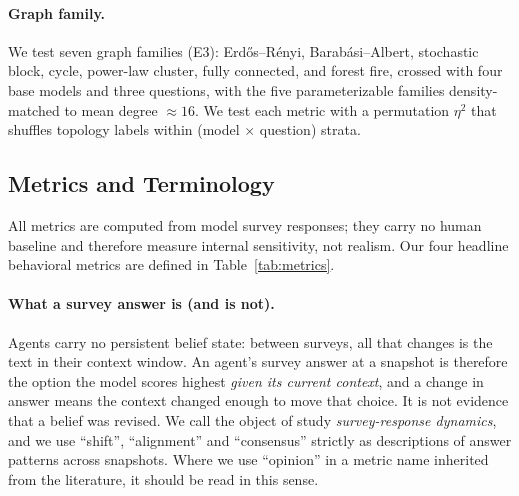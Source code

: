 \documentclass[letterpaper]{article} %
\begin{document}
\paragraph{Graph family.} We test seven graph families (E3): Erd\H{o}s--R\'enyi, Barab\'asi--Albert, stochastic block, cycle, power-law cluster, fully connected, and forest fire, crossed with four base models and three questions, with the five parameterizable families density-matched to mean degree $\approx 16$. We test each metric with a permutation $\eta^2$ that shuffles topology labels within (model $\times$ question) strata.

\subsection{Metrics and Terminology}
\label{sec:metrics}
All metrics are computed from model survey responses; they carry no human baseline and therefore measure internal sensitivity, not realism. Our four headline behavioral metrics are defined in Table~\ref{tab:metrics}.

\paragraph{What a survey answer is (and is not).} Agents carry no persistent belief state: between surveys, all that changes is the text in their context window. An agent's survey answer at a snapshot is therefore the option the model scores highest \emph{given its current context}, and a change in answer means the context changed enough to move that choice. It is not evidence that a belief was revised. We call the object of study \emph{survey-response dynamics}, and we use ``shift'', ``alignment'' and ``consensus'' strictly as descriptions of answer patterns across snapshots. Where we use ``opinion'' in a metric name inherited from the literature, it should be read in this sense.
\end{document}
